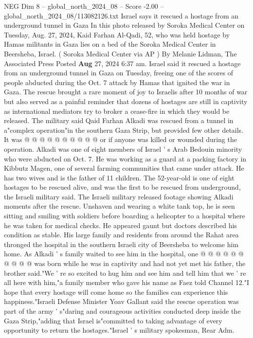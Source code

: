 \begin{textsample}{NEG Dim 8 – global\_north\_2024\_08 – Score -2.00 – global\_north\_2024\_08/113082126.txt}  \label{ex:f8_neg_119}
Israel says it rescued a hostage from an underground tunnel in Gaza In this photo released by Soroka Medical Center on Tuesday, Aug. 27, 2024, Kaid Farhan Al-Qadi, 52, who was held hostage by Hamas militants in Gaza lies on a bed of the Soroka Medical Center in Beersheba, Israel. ( Soroka Medical Center via AP ) By Melanie Lidman, The Associated Press Posted \textbf{Aug} 27, 2024 6:37 am.
Israel said it rescued a hostage from an underground tunnel in Gaza on Tuesday, freeing one of the scores of people abducted during the Oct. 7 attack by Hamas that ignited the war in Gaza.
The rescue brought a rare moment of joy to Israelis after 10 months of war but also served as a painful reminder that dozens of hostages are still in captivity as international mediators try to broker a cease-fire in which they would be released.
The military said Qaid Farhan Alkadi was rescued from a tunnel in a"complex operation"in the southern Gaza Strip, but provided few other details.
It was @ @ @ @ @ @ @ @ @ @ or if anyone was killed or wounded during the operation.
Alkadi was one of eight members of Israel ' s Arab Bedouin minority who were abducted on Oct. 7.
He was working as a guard at a packing factory in Kibbutz Magen, one of several farming communities that came under attack.
He has two wives and is the father of 11 children.
The 52-year-old is one of eight hostages to be rescued alive, and was the first to be rescued from underground, the Israeli military said.
The Israeli military released footage showing Alkadi moments after the rescue.
Unshaven and wearing a white tank top, he is seen sitting and smiling with soldiers before boarding a helicopter to a hospital where he was taken for medical checks.
He appeared gaunt but doctors described his condition as stable.
His large family and residents from around the Rahat area thronged the hospital in the southern Israeli city of Beersheba to welcome him home.
As Alkadi ' s family waited to see him in the hospital, one @ @ @ @ @ @ @ @ @ @ was born while he was in captivity and had not yet met his father, the brother said."We ' re so excited to hug him and see him and tell him that we ' re all here with him,"a family member who gave his name as Faez told Channel 12."I hope that every hostage will come home so the families can experience this happiness."Israeli Defense Minister Yoav Gallant said the rescue operation was part of the army ' s"daring and courageous activities conducted deep inside the Gaza Strip,"adding that Israel is"committed to taking advantage of every opportunity to return the hostages."Israel ' s military spokesman, Rear Adm.

\end{textsample}
